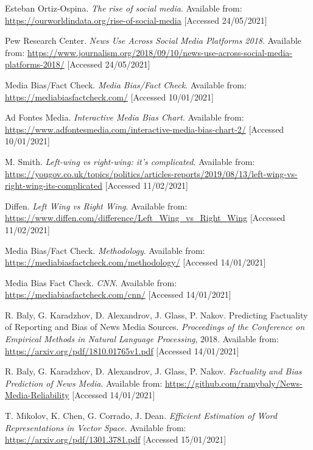 \begin{thebibliography}{9}

Esteban Ortiz-Ospina. \textit{The rise of social media}. Available from: \url{https://ourworldindata.org/rise-of-social-media} [Accessed 24/05/2021]

Pew Research Center. \textit{News Use Across Social Media Platforms 2018}. Available from: \url{https://www.journalism.org/2018/09/10/news-use-across-social-media-platforms-2018/} [Accessed 24/05/2021]

Media Bias/Fact Check. \textit{Media Bias/Fact Check}. Available from: \url{https://mediabiasfactcheck.com/} [Accessed 10/01/2021]

Ad Fontes Media. \textit{Interactive Media Bias Chart}. Available from: \url{https://www.adfontesmedia.com/interactive-media-bias-chart-2/} [Accessed 10/01/2021]

M. Smith. \textit{Left-wing vs right-wing: it’s complicated}. Available from: 
\url{https://yougov.co.uk/topics/politics/articles-reports/2019/08/13/left-wing-vs-right-wing-its-complicated} [Accessed 11/02/2021]

Diffen. \textit{Left Wing vs Right Wing}. Available from: \url{https://www.diffen.com/difference/Left_Wing_vs_Right_Wing} [Accessed 11/02/2021]

Media Bias/Fact Check. \textit{Methodology}. Available from: \url{https://mediabiasfactcheck.com/methodology/} [Accessed 14/01/2021]

Media Bias Fact Check. \textit{CNN}. Available from: \url{https://mediabiasfactcheck.com/cnn/} [Accessed 14/01/2021]

R. Baly, G. Karadzhov, D. Alexandrov, J. Glass, P. Nakov. Predicting Factuality of Reporting and Bias of News Media Sources. \textit{Proceedings of the Conference on Empirical Methods in Natural Language Processing}, 2018. Available from: \url{https://arxiv.org/pdf/1810.01765v1.pdf} [Accessed 14/01/2021]

R. Baly, G. Karadzhov, D. Alexandrov, J. Glass, P. Nakov. \textit{Factuality and Bias Prediction of News Media}. Available from: \url{https://github.com/ramybaly/News-Media-Reliability} [Accessed 14/01/2021]

T. Mikolov, K. Chen, G. Corrado, J. Dean. \textit{Efficient Estimation of Word Representations in Vector Space.} Available from: \url{https://arxiv.org/pdf/1301.3781.pdf} [Accessed 15/01/2021]


\end{thebibliography}
